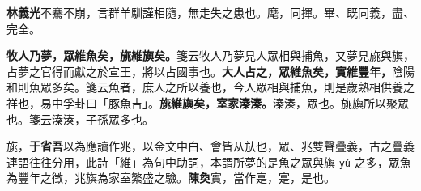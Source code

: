 \begin{quoting}\textbf{林義光}不騫不崩，言群羊馴謹相隨，無走失之患也。麾，同揮。畢、既同義，盡、完全。\end{quoting}

\textbf{牧人乃夢，眾維魚矣，旐維旟矣。}{\footnotesize 箋云牧人乃夢見人眾相與捕魚，又夢見旐與旟，占夢之官得而獻之於宣王，將以占國事也。}\textbf{大人占之，眾維魚矣，實維豐年，}{\footnotesize 陰陽和則魚眾多矣。箋云魚者，庶人之所以養也，今人眾相與捕魚，則是歲熟相供養之祥也，易中孚卦曰「豚魚吉」。}\textbf{旐維旟矣，室家溱溱。}{\footnotesize 溱溱，眾也。旐旟所以聚眾也。箋云溱溱，子孫眾多也。}

\begin{quoting}旐，\textbf{于省吾}以為應讀作兆，以金文中白、會皆从㫃也，眾、兆雙聲疊義，古之疊義連語往往分用，此詩「維」為句中助詞，本謂所夢的是魚之眾與旟 \texttt{yú} 之多，眾魚為豐年之徵，兆旟為家室繁盛之驗。\textbf{陳奐}實，當作寔，寔，是也。\end{quoting}

